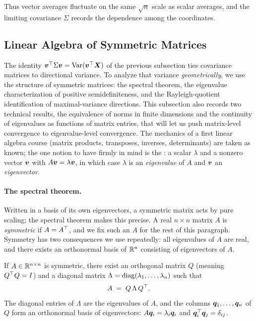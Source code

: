Thus vector averages fluctuate on the same \(\sqrt{n}\) scale as scalar averages, and the limiting covariance \(\Sigma\) records the dependence among the coordinates.

\subsection{Linear Algebra of Symmetric Matrices}\label{subsec:linalg}

The identity \(\bm{v}^{\top} \Sigma \bm{v} = \operatorname{Var}(\bm{v}^{\top} \bm{X})\) of the previous subsection ties covariance matrices to directional variance. To analyze that variance \emph{geometrically}, we use the structure of symmetric matrices: the spectral theorem, the eigenvalue characterization of positive semidefiniteness, and the Rayleigh-quotient identification of maximal-variance directions. This subsection also records two technical results, the equivalence of norms in finite dimensions and the continuity of eigenvalues as functions of matrix entries, that will let us push matrix-level convergence to eigenvalue-level convergence. The mechanics of a first linear algebra course (matrix products, transposes, inverses, determinants) are taken as known; the one notion to have firmly in mind is the : a scalar \(\lambda\) and a nonzero vector \(\bm{v}\) with \(A\bm{v} = \lambda\bm{v}\), in which case \(\lambda\) is an \emph{eigenvalue} of \(A\) and \(\bm{v}\) an \emph{eigenvector}.

\paragraph{The spectral theorem.}
Written in a basis of its own eigenvectors, a symmetric matrix acts by pure scaling; the spectral theorem makes this precise. A real \(n \times n\) matrix \(A\) is \emph{symmetric} if \(A = A^{\top}\), and we fix such an \(A\) for the rest of this paragraph. Symmetry has two consequences we use repeatedly: all eigenvalues of \(A\) are real, and there exists an orthonormal basis of \(\mathbb{R}^n\) consisting of eigenvectors of \(A\).

\begin{theorem}\label{thm:spectral}
If \(A \in \mathbb{R}^{n \times n}\) is symmetric, there exist an orthogonal matrix \(Q\) (meaning \(Q^{\top} Q = I\)) and a diagonal matrix \(\Lambda = \operatorname{diag}(\lambda_1, \ldots, \lambda_n)\) such that
\begin{equation}
  A \;=\; Q\, \Lambda\, Q^{\top}.
  \label{eq:spectral}
\end{equation}
The diagonal entries of \(\Lambda\) are the eigenvalues of \(A\), and the columns \(\bm{q}_1, \ldots, \bm{q}_n\) of \(Q\) form an orthonormal basis of eigenvectors: \(A \bm{q}_i = \lambda_i \bm{q}_i\) and \(\bm{q}_i^{\top} \bm{q}_j = \delta_{ij}\).
\end{theorem}

